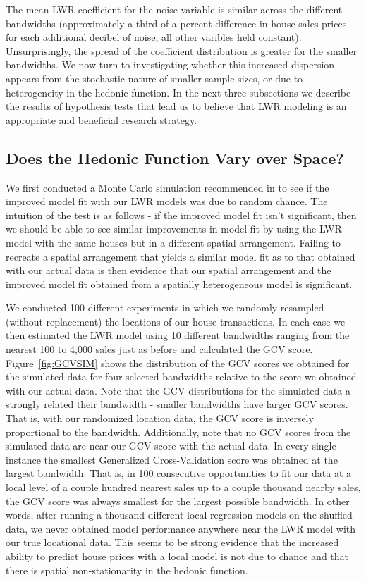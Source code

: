 \documentclass{article}\usepackage{graphicx, color}
\begin{document}
The mean LWR coefficient for the noise variable is similar across the different bandwidths (approximately a third of a percent difference in house sales prices for each additional decibel of noise, all other varibles held constant). Unsurprisingly, the spread of the coefficient distribution is greater for the smaller bandwidths. We now turn to investigating whether this increased dispersion appears from the stochastic nature of smaller sample sizes, or due to heterogeneity in the hedonic function. In the next three subsections we describe the results of hypothesis tests that lead us to believe that LWR modeling is an appropriate and beneficial research strategy. 

\subsection{Does the Hedonic Function Vary over Space?}

We first conducted a Monte Carlo simulation recommended in \citet{Fotheringham2002} to see if the improved model fit with our LWR models was due to random chance. The intuition of the test is as follows - if the improved model fit isn't significant, then we should be able to see similar improvements in model fit by using the LWR model with the same houses but in a different spatial arrangement. Failing to recreate a spatial arrangement that yields a similar model fit as to that obtained with our actual data is then evidence that our spatial arrangement and the improved model fit obtained from a spatially heterogeneous model is significant. 

We conducted 100 different experiments in which we randomly resampled (without replacement) the locations of our house transactions. In each case we then estimated the LWR model using 10 different bandwidths ranging from the nearest 100 to 4,000 sales just as before and calculated the GCV score. Figure~\ref{fig:GCVSIM} shows the distribution of the GCV scores we obtained for the simulated data for four selected bandwidths relative to the score we obtained with our actual data. Note that the GCV distributions for the simulated data a strongly related their bandwidth - smaller bandwidths have larger GCV scores. That is, with our randomized location data, the GCV score is inversely proportional to the bandwidth. Additionally, note that no GCV scores from the simulated data are near our GCV score with the actual data. In every single instance the smallest Generalized Cross-Validation score was obtained at the largest bandwidth. That is, in 100 consecutive opportunities to fit our data at a local level of a couple hundred nearest sales up to a couple thousand nearby sales, the GCV score was always smallest for the largest possible bandwidth. In other words, after running a thousand different local regression models on the shuffled data, we never obtained model performance anywhere near the LWR model with our true locational data. This seems to be strong evidence that the increased ability to predict house prices with a local model is not due to chance and that there is spatial non-stationarity in the hedonic function. 
\end{document}
